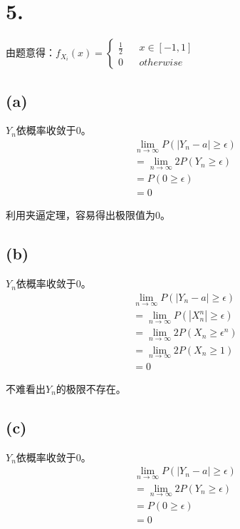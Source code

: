 \documentclass[UTF8]{report}
\begin{document}
    \section*{5.}
        由题意得：$f_{X_i}(x) = \left\{
            \begin{array}{lcr}
                \frac{1}{2} & & x \in [-1, 1]\\
                 0 & & otherwise
            \end{array}
        \right.$
        \subsection*{(a)}
            $Y_n$依概率收敛于0。
            $$\begin{array}{l}
                \lim_{n \to \infty}P(|Y_n - a| \geq \epsilon)\\
                = \lim_{n \to \infty}2P(Y_n \geq \epsilon)\\
                = P(0 \geq \epsilon)\\
                = 0
            \end{array}$$

            利用夹逼定理，容易得出极限值为0。
        \subsection*{(b)}
            $Y_n$依概率收敛于0。
            $$\begin{array}{l}
                \lim_{n \to \infty}P(|Y_n - a| \geq \epsilon)\\
                = \lim_{n \to \infty}P(|X_n^n| \geq \epsilon)\\
                = \lim_{n \to \infty}2P(X_n \geq \epsilon^n)\\
                = \lim_{n \to \infty}2P(X_n \geq 1)\\
                = 0
            \end{array}$$

            不难看出$Y_n$的极限不存在。
        \subsection*{(c)}
            $Y_n$依概率收敛于0。
            $$\begin{array}{l}
                \lim_{n \to \infty}P(|Y_n - a| \geq \epsilon)\\
                = \lim_{n \to \infty}2P(Y_n \geq \epsilon)\\
                = P(0 \geq \epsilon)\\
                = 0
            \end{array}$$
\end{document}
